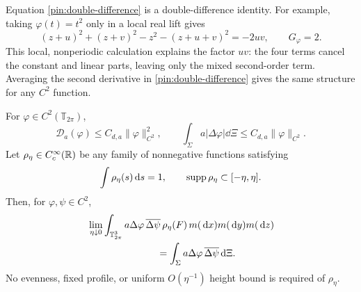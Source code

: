 Equation \eqref{pin:double-difference} is a double-difference identity.
For example, taking $\varphi(t)=t^2$ only in a local real lift gives
\[
 (z+u)^2+(z+v)^2-z^2-(z+u+v)^2=-2uv,
 \qquad G_\varphi=2.
\]
This local, nonperiodic calculation explains the factor $uv$: the four
terms cancel the constant and linear parts, leaving only the mixed
second-order term. Averaging the second derivative in
\eqref{pin:double-difference} gives the same structure for any $C^2$
function.

\begin{proposition}
\label{pin:mollifier}
For $\varphi\in C^2(\mathbb T_{2\pi})$,
\begin{equation}
 \mathcal D_a(\varphi)\le C_{d,a}\|\varphi\|_{C^2}^2,
 \qquad
 \int_\Sigma a|\Delta\varphi|\dd\Xi
       \le C_{d,a}\|\varphi\|_{C^2}.
 \label{pin:finite-energy}
\end{equation}
Let $\rho_\eta\in C_c^\infty(\mathbb R)$ be any family of nonnegative
functions satisfying
\begin{equation}
       \int\rho_\eta(s)\,\mathrm d s=1,\qquad
       \operatorname{supp}\rho_\eta\subset[-\eta,\eta].
 \label{pin:mollifier-assumptions}
\end{equation}
Then, for $\varphi,\psi\in C^2$,
\begin{equation}
 \begin{split}
 &\lim_{\eta\downarrow0}
 \int_{\mathbb T_{2\pi}^3}
      a\Delta\varphi\,\overline{\Delta\psi}\,
      \rho_\eta(F)\,m(\dd x)m(\dd y)m(\dd z)\\
 &\hspace{25mm}=\int_\Sigma a\Delta\varphi\,
                               \overline{\Delta\psi}\dd\Xi.
 \end{split}
 \label{pin:mollified-form}
\end{equation}
No evenness, fixed profile, or uniform $O(\eta^{-1})$ height bound is
required of $\rho_\eta$.
\end{proposition}

